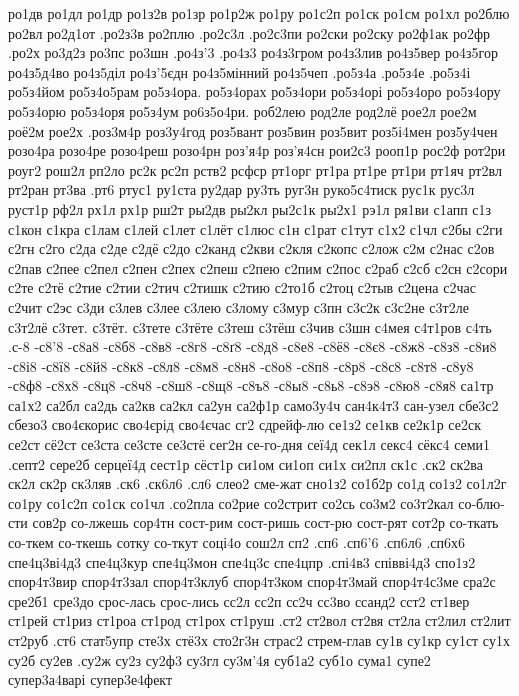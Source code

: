 {{ро1дв
ро1дл
ро1др
ро1з2в
ро1зр
ро1р2ж
ро1ру
ро1с2п
ро1ск
ро1см
ро1хл
ро2блю
ро2вл
ро2д1от
.ро2з3в
ро2плю
.ро2с3л
.ро2с3пи
ро2ски
ро2ску
ро2ф1ак
ро2фр
.ро2х
ро3д2з
ро3пс
ро3шн
.ро4з'3
.ро4з3
ро4з3гром
ро4з3лив
ро4з5вер
ро4з5гор
ро4з5д4во
ро4з5діл
ро4з'5єдн
ро4з5мінний
ро4з5чеп
.ро5з4а
.ро5з4е
.ро5з4і
ро5з4йом
ро5з4о5рам
ро5з4ора.
ро5з4орах
ро5з4ори
ро5з4орі
ро5з4оро
ро5з4ору
ро5з4орю
ро5з4оря
ро5з4ум
ро6з5о4ри.
роб2лею
род2ле
род2лё
рое2л
рое2м
роё2м
рое2х
.роз3м4р
роз3у4год
роз5вант
роз5вин
роз5вит
роз5і4мен
роз5у4чен
розо4ра
розо4ре
розо4реш
розо4рн
роз'я4р
роз'я4сн
рои2с3
рооп1р
рос2ф
рот2ри
роуг2
рош2л
рп2ло
рс2к
рс2п
рств2
рсфср
рт1орг
рт1ра
рт1ре
рт1ри
рт1яч
рт2вл
рт2ран
рт3ва
.рт6
ртус1
ру1ста
ру2дар
ру3ть
руг3н
руко5с4тиск
рус1к
рус3л
руст1р
рф2л
рх1л
рх1р
рш2т
ры2дв
ры2кл
ры2с1к
ры2х1
рэ1л
ря1ви
с1апп
с1з
с1кон
с1кра
с1лам
с1лей
с1лет
с1лёт
с1люс
с1н
с1рат
с1тут
с1х2
с1чл
с2бы
с2ги
с2гн
с2го
с2да
с2де
с2дё
с2до
с2канд
с2кви
с2кля
с2копс
с2лож
с2м
с2нас
с2ов
с2пав
с2пее
с2пел
с2пен
с2пех
с2пеш
с2пею
с2пим
с2пос
с2раб
с2сб
с2сн
с2сори
с2те
с2тё
с2тие
с2тии
с2тич
с2тишк
с2тию
с2то1б
с2тоц
с2тыв
с2цена
с2час
с2чит
с2эс
с3ди
с3лев
с3лее
с3лею
с3лому
с3мур
с3пн
с3с2к
с3с2не
с3т2ле
с3т2лё
с3тет.
с3тёт.
с3тете
с3тёте
с3теш
с3тёш
с3чив
с3шн
с4мея
с4т1ров
с4ть
.с-8
-с8'8
-с8а8
-с8б8
-с8в8
-с8г8
-с8ґ8
-с8д8
-с8е8
-с8ё8
-с8є8
-с8ж8
-с8з8
-с8и8
-с8і8
-с8ї8
-с8й8
-с8к8
-с8л8
-с8м8
-с8н8
-с8о8
-с8п8
-с8р8
-с8с8
-с8т8
-с8у8
-с8ф8
-с8х8
-с8ц8
-с8ч8
-с8ш8
-с8щ8
-с8ъ8
-с8ы8
-с8ь8
-с8э8
-с8ю8
-с8я8
са1тр
са1х2
са2бл
са2дь
са2кв
са2кл
са2ун
са2ф1р
само3у4ч
сан4к4т3
сан-узел
сбе3с2
сбезо3
сво4єкорис
сво4єрід
сво4єчас
сг2
сдрейф-лю
се1з2
се1кв
се2к1р
се2ск
се2ст
сё2ст
се3ста
се3сте
се3стё
сег2н
се-го-дня
сеї4д
сек1л
секс4
сёкс4
семи1
.септ2
сере2б
серцеї4д
сест1р
сёст1р
си1ом
си1оп
си1х
си2пл
ск1с
.ск2
ск2ва
ск2л
ск2р
ск3ляв
.ск6
.ск6л6
.сл6
слео2
сме-жат
сно1з2
со1б2р
со1д
со1з2
со1л2г
со1ру
со1с2п
со1ск
со1чл
.со2пла
со2рие
со2стрит
со2сь
со3м2
со3т2кал
со-блю-сти
сов2р
со-лжешь
сор4тн
сост-рим
сост-ришь
сост-рю
сост-рят
сот2р
со-ткать
со-ткем
со-ткешь
сотку
со-ткут
соці4о
сош2л
сп2
.сп6
.сп6'6
.сп6л6
.сп6х6
спе4ц3ві4д3
спе4ц3кур
спе4ц3мон
спе4ц3с
спе4цпр
.спі4в3
співві4д3
спо1з2
спор4т3вир
спор4т3зал
спор4т3клуб
спор4т3ком
спор4т3май
спор4т4с3ме
сра2с
сре2б1
сре3до
срос-лась
срос-лись
сс2л
сс2п
сс2ч
сс3во
ссанд2
сст2
ст1вер
ст1рей
ст1риз
ст1роа
ст1род
ст1рох
ст1руш
.ст2
ст2вол
ст2вя
ст2ла
ст2лил
ст2лит
ст2руб
.ст6
стат5упр
сте3х
стё3х
сто2г3н
страс2
стрем-глав
су1в
су1кр
су1ст
су1х
су2б
су2ев
.су2ж
су2з
су2ф3
су3гл
су3м'4я
суб1а2
суб1о
сума1
супе2
супер3а4варі
супер3е4фект
}}
